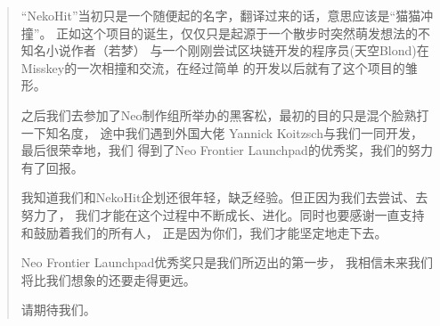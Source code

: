 \begin{quotation}
    “NekoHit”当初只是一个随便起的名字，翻译过来的话，意思应该是“猫猫冲撞”。
    正如这个项目的诞生，仅仅只是起源于一个散步时突然萌发想法的不知名小说作者（若梦）
    与一个刚刚尝试区块链开发的程序员(天空Blond)在Misskey的一次相撞和交流，在经过简单
    的开发以后就有了这个项目的雏形。

    之后我们去参加了Neo制作组所举办的黑客松，最初的目的只是混个脸熟打一下知名度，
    途中我们遇到外国大佬 Yannick Koitzsch与我们一同开发，最后很荣幸地，我们
    得到了Neo Frontier Launchpad的优秀奖，我们的努力有了回报。

    我知道我们和NekoHit企划还很年轻，缺乏经验。但正因为我们去尝试、去努力了，
    我们才能在这个过程中不断成长、进化。同时也要感谢一直支持和鼓励着我们的所有人，
    正是因为你们，我们才能坚定地走下去。

    Neo Frontier Launchpad优秀奖只是我们所迈出的第一步，
    我相信未来我们将比我们想象的还要走得更远。

    请期待我们。

\end{quotation}

